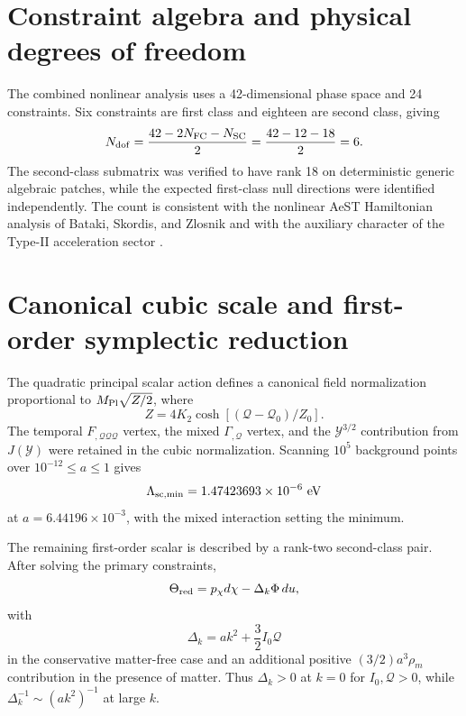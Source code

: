 \documentclass[aps,prd,twocolumn,superscriptaddress,nofootinbib,longbibliography,floatfix]{revtex4-2}
\newcommand{\Y}{\mathcal{Y}}
\newcommand{\Q}{\mathcal{Q}}
\newcommand{\mpl}{M_{\rm Pl}}
\begin{document}
\section{Constraint algebra and physical degrees of freedom}\label{app:dirac}
The combined nonlinear analysis uses a 42-dimensional phase space and 24 constraints. Six constraints are first class and eighteen are second class, giving
\begin{equation}
N_{\rm dof}=\frac{42-2N_{\rm FC}-N_{\rm SC}}{2}
=\frac{42-12-18}{2}=6.
\end{equation}
The second-class submatrix was verified to have rank 18 on deterministic generic algebraic patches, while the expected first-class null directions were identified independently. The count is consistent with the nonlinear AeST Hamiltonian analysis of Bataki, Skordis, and Zlosnik \cite{BatakiSkordisZlosnik2024} and with the auxiliary character of the Type-II acceleration sector \cite{DeFeliceMaedaMukohyamaPookkillath2022}.

\section{Canonical cubic scale and first-order symplectic reduction}\label{app:cutoff}
The quadratic principal scalar action defines a canonical field normalization proportional to $\mpl\sqrt{Z/2}$, where
\begin{equation}
Z=4K_2\cosh[(\Q-\Q_0)/Z_0].
\end{equation}
The temporal $F_{,\Q\Q\Q}$ vertex, the mixed $\Gamma_{,\Q}$ vertex, and the $\Y^{3/2}$ contribution from $J(\Y)$ were retained in the cubic normalization. Scanning $10^5$ background points over $10^{-12}\le a\le1$ gives
\begin{equation}
\Lambda_{\rm sc,min}=1.47423693\times10^{-6}\ {\rm eV}
\end{equation}
at $a=6.44196\times10^{-3}$, with the mixed interaction setting the minimum.

The remaining first-order scalar is described by a rank-two second-class pair. After solving the primary constraints,
\begin{equation}
\Theta_{\rm red}=p_\chi d\chi-\Delta_k\Phi\,du,
\end{equation}
with
\begin{equation}
\Delta_k=ak^2+\frac32I_0\Q
\end{equation}
in the conservative matter-free case and an additional positive $(3/2)a^3\rho_m$ contribution in the presence of matter. Thus $\Delta_k>0$ at $k=0$ for $I_0,\Q>0$, while $\Delta_k^{-1}\sim(ak^2)^{-1}$ at large $k$.
\end{document}
